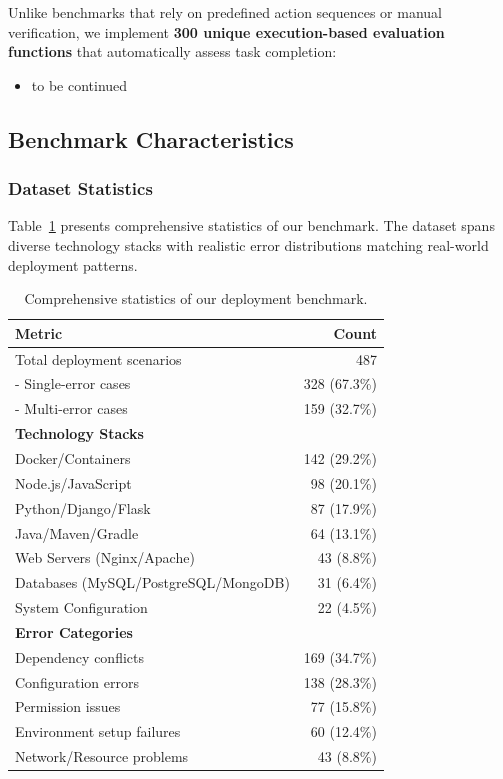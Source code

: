 Unlike benchmarks that rely on predefined action sequences or manual verification, we implement \textbf{300 unique execution-based evaluation functions} that automatically assess task completion:

\begin{itemize}
\item to be continued
\end{itemize}
\subsection{Benchmark Characteristics}\label{sec:characteristics}

\subsubsection{Dataset Statistics}

Table~\ref{tab:benchmark-stats} presents comprehensive statistics of our benchmark. The dataset spans diverse technology stacks with realistic error distributions matching real-world deployment patterns.

\begin{table}[t]
\centering
\caption{Comprehensive statistics of our deployment benchmark.}
\label{tab:benchmark-stats}
\small
\begin{tabular}{@{}lr@{}}
\toprule
\textbf{Metric} & \textbf{Count} \\
\midrule
Total deployment scenarios & 487 \\
\quad - Single-error cases & 328 (67.3\%) \\
\quad - Multi-error cases & 159 (32.7\%) \\
\midrule
\textbf{Technology Stacks} & \\
\quad Docker/Containers & 142 (29.2\%) \\
\quad Node.js/JavaScript & 98 (20.1\%) \\
\quad Python/Django/Flask & 87 (17.9\%) \\
\quad Java/Maven/Gradle & 64 (13.1\%) \\
\quad Web Servers (Nginx/Apache) & 43 (8.8\%) \\
\quad Databases (MySQL/PostgreSQL/MongoDB) & 31 (6.4\%) \\
\quad System Configuration & 22 (4.5\%) \\
\midrule
\textbf{Error Categories} & \\
\quad Dependency conflicts & 169 (34.7\%) \\
\quad Configuration errors & 138 (28.3\%) \\
\quad Permission issues & 77 (15.8\%) \\
\quad Environment setup failures & 60 (12.4\%) \\
\quad Network/Resource problems & 43 (8.8\%) \\
\midrule

\end{tabular}
\end{table}

